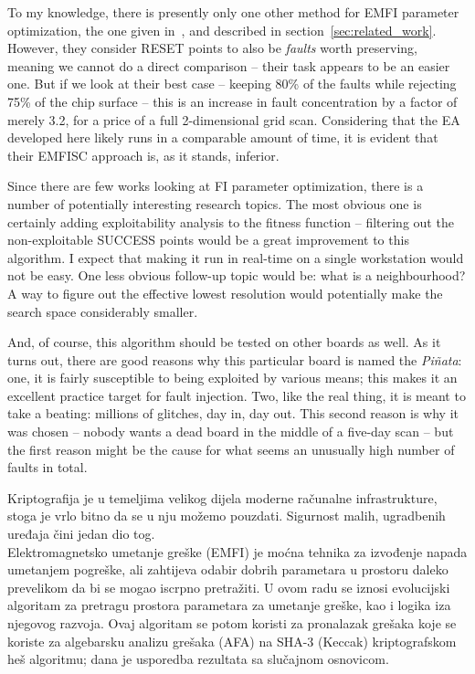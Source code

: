 \documentclass[times, utf8, diplomski]{fer}
\begin{document}
To my knowledge, there is presently only one other method for EMFI parameter
optimization, the one given in~\cite{madau2017fault}, and described in section~\ref{sec:related_work}.
However, they consider RESET points to also be \emph{faults} worth preserving,
meaning we cannot do a direct comparison -- their task appears to be an easier one.
But if we look at their best case -- keeping 80\% of the faults while rejecting
75\% of the chip surface -- this is an increase in fault concentration by a
factor of merely 3.2, for a price of a full 2-dimensional grid scan.
Considering that the EA developed here likely runs in a comparable amount of time,
it is evident that their EMFISC approach is, as it stands, inferior.

Since there are few works looking at FI parameter optimization, there is a
number of potentially interesting research topics. The most obvious one is
certainly adding exploitability analysis to the fitness function -- filtering
out the non-exploitable SUCCESS points would be a great improvement to this
algorithm. I expect that making it run in real-time on a single workstation
would not be easy. One less obvious follow-up topic would be: what is a
neighbourhood? A way to figure out the effective lowest resolution would
potentially make the search space considerably smaller.

And, of course, this algorithm should be tested on other boards as well.
As it turns out, there are good reasons why this particular board is named
the \emph{Piñata}: one, it is fairly susceptible to being exploited by various
means; this makes it an excellent practice target for fault injection.
Two, like the real thing, it is meant to take a beating: millions of glitches,
day in, day out. This second reason is why it was chosen -- nobody wants a dead
board in the middle of a five-day scan -- but the first reason might be the cause
for what seems an unusually high number of faults in total.







\begin{sazetak}
Kriptografija je u temeljima velikog dijela moderne računalne infrastrukture,
stoga je vrlo bitno da se u nju možemo pouzdati. Sigurnost malih, ugradbenih
uređaja čini jedan dio tog. \\
Elektromagnetsko umetanje greške (EMFI) je moćna tehnika za izvođenje napada
umetanjem pogreške, ali zahtijeva odabir dobrih parametara u prostoru daleko
prevelikom da bi se mogao iscrpno pretražiti. U ovom radu se iznosi evolucijski
algoritam za pretragu prostora parametara za umetanje greške, kao i logika
iza njegovog razvoja. Ovaj algoritam se potom koristi za pronalazak grešaka
koje se koriste za algebarsku analizu grešaka (AFA) na SHA-3 (Keccak)
kriptografskom heš algoritmu; dana je usporedba rezultata sa slučajnom
osnovicom.

\end{sazetak}
\end{document}
